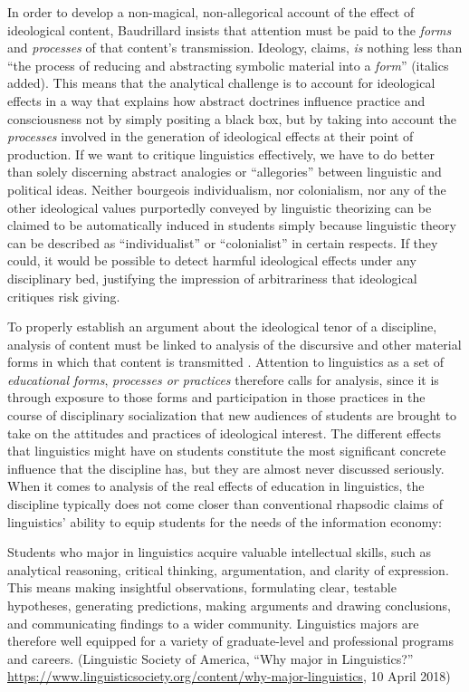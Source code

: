 \documentclass[output=paper]{langscibook}
\begin{document}
In order to develop a non-magical, non-allegorical account of the effect of ideological content, Baudrillard insists that attention must be paid to the \emph{forms} and \emph{processes} of that content's transmission. Ideology, \citet[80]{Baudrillard19881972} claims, \emph{is} nothing less than ``the process of reducing and abstracting symbolic material into a \emph{form}'' (italics added). This means that the analytical challenge is to account for ideological effects in a way that explains how abstract doctrines influence practice and consciousness not by simply positing a black box, but by taking into account the \emph{processes} involved in the generation of ideological effects at their point of production. If we want to critique linguistics effectively, we have to do better than solely discerning abstract analogies or ``allegories'' between linguistic and political ideas. Neither bourgeois individualism, nor colonialism, nor any of the other ideological values purportedly conveyed by linguistic theorizing can be claimed to be automatically induced in students simply because linguistic theory can be described as ``individualist'' or ``colonialist'' in certain respects. If they could, it would be possible to detect harmful ideological effects under any disciplinary bed, justifying the impression of arbitrariness that ideological critiques risk giving.

To properly establish an argument about the ideological tenor of a discipline, analysis of content must be linked to analysis of the discursive and other material forms in which that content is transmitted \citep[cf.][]{Debry19961994}. Attention to linguistics as a set of \emph{educational forms}, \emph{processes or practices} therefore calls for analysis, since it is through exposure to those forms and participation in those practices in the course of disciplinary socialization that new audiences of students are brought to take on the attitudes and practices of ideological interest. The different effects that linguistics might have on students constitute the most significant concrete influence that the discipline has, but they are almost never discussed seriously. When it comes to analysis of the real effects of education in linguistics, the discipline typically does not come closer than conventional rhapsodic claims of linguistics' ability to equip students for the needs of the information economy:

\begin{modquote}
\sloppy
Students who major in linguistics acquire valuable intellectual skills, such as analytical reasoning, critical thinking, argumentation, and clarity of expression. This means making insightful observations, formulating clear, testable hypotheses, generating predictions, making arguments and drawing conclusions, and communicating findings to a wider community. Linguistics majors are therefore well equipped for a variety of graduate-level and professional programs and careers. (Linguistic Society of America, ``Why major in Linguistics?''\\
\url{https://www.linguisticsociety.org/content/why-major-linguistics}, 10 April 2018)
\end{modquote}
\end{document}
